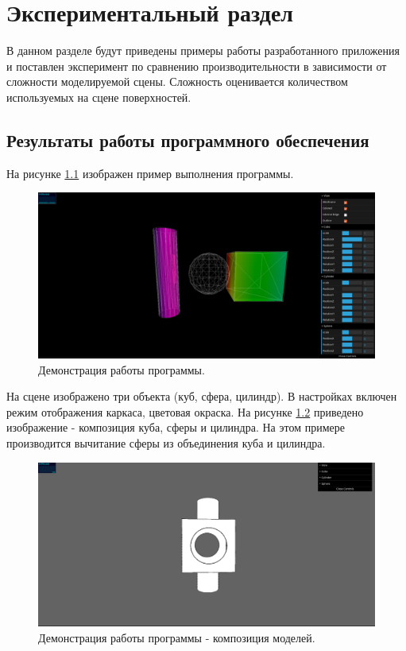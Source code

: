 \chapter{Экспериментальный раздел}
\label{cha:research}

В данном разделе будут приведены примеры работы разработанного
приложения и поставлен эксперимент по сравнению производительности
в зависимости от сложности моделируемой сцены. Сложность оценивается количеством используемых на сцене поверхностей.

\section{Результаты работы программного обеспечения}
На рисунке \ref{fig:example_run} изображен пример выполнения программы. 
\begin{figure}
  \centering
  \includegraphics[scale=0.4]{inc/img/example_run}
  \caption{Демонстрация работы программы.}
  \label{fig:example_run}
\end{figure}

На сцене изображено три объекта (куб, сфера, цилиндр).
В настройках включен режим отображения каркаса, цветовая окраска.
\newpage
На рисунке \ref{fig:example_run_base} приведено изображение - композиция куба, 
сферы и цилиндра. 
На этом примере производится вычитание сферы из объединения куба и цилиндра.
\begin{figure}
  \centering
  \includegraphics[scale=0.4]{inc/img/example_run_base}
  \caption{Демонстрация работы программы - композиция моделей.}
  \label{fig:example_run_base}
\end{figure}

